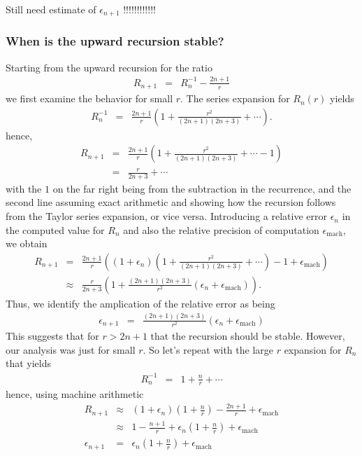\documentclass[12pt]{article}
\begin{document}
Still need estimate of $\epsilon_{n+1}$ !!!!!!!!!!!!

\subsubsection{When is the upward recursion stable?}

Starting from the upward recursion for the ratio
\begin{eqnarray}
  R_{n+1} & = & R_{n}^{-1} - \frac{2n+1}{r}
\end{eqnarray}
we first examine the behavior for small $r$.  The series expansion for $R_n(r)$ yields
\begin{eqnarray}
  R_n^{-1} & = & \frac{2n+1}{r} \left(1 + \frac{r^2}{(2n+1)(2n+3)} + \cdots \right) .
\end{eqnarray}
hence,
\begin{eqnarray}
  R_{n+1} & = & \frac{2n+1}{r} \left(1 + \frac{r^2}{(2n+1)(2n+3)} + \cdots - 1 \right) \\
         & = & \frac{r}{2n+3} + \cdots
\end{eqnarray}
with the $1$ on the far right being from the subtraction in the recurrence, and the second line assuming exact arithmetic and showing how the recursion follows from the Taylor series expansion, or vice versa. Introducing a relative error $\epsilon_n$ in the computed value for $R_n$ and also the relative precision of computation $\epsilon_{\mbox{mach}}$, we obtain
\begin{eqnarray}
  R_{n+1} & = & \frac{2n+1}{r} \left( (1+\epsilon_n) \left(1 + \frac{r^2}{(2n+1)(2n+3)} + \cdots\right) - 1 + \epsilon_{\mbox{mach}} \right) \\
         & \approx & \frac{r}{2n+3}\left(1 + \frac{(2n+1)(2n+3)}{r^2}(\epsilon_n + \epsilon_{\mbox{mach}})\right).
\end{eqnarray}
Thus, we identify the amplication of the relative error as being
\begin{eqnarray}
  \epsilon_{n+1} & = & \frac{(2n+1)(2n+3)}{r^2}(\epsilon_n + \epsilon_{\mbox{mach}})
\end{eqnarray}
This suggests that for $r>2n+1$ that the recursion should be stable.  However, our analysis was just for small $r$.  So let's repeat with the large $r$ expansion for $R_n$ that yields
\begin{eqnarray}
  R_n^{-1} & = & 1 + \frac{n}{r} + \cdots
\end{eqnarray}
hence, using machine arithmetic
\begin{eqnarray}
  R_{n+1} & \approx & (1 + \epsilon_n) \left(1 + \frac{n}{r} \right) - \frac{2n+1}{r} + \epsilon_{\mbox{mach}} \\
         & \approx & 1 - \frac{n+1}{r} + \epsilon_n \left(1 + \frac{n}{r} \right) + \epsilon_{\mbox{mach}} \\
  \epsilon_{n+1} & = & \epsilon_n \left(1 + \frac{n}{r} \right) + \epsilon_{\mbox{mach}}
\end{eqnarray}
\end{document}
